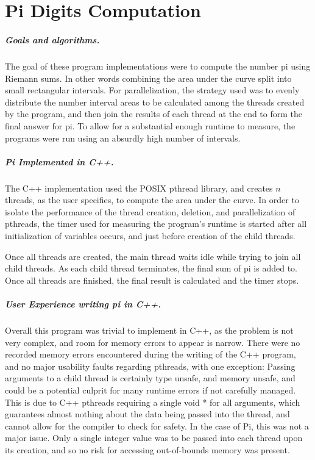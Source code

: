 \chapter{Pi Digits Computation}
\paragraph{Goals and algorithms.}
The goal of these program implementations were to compute the number pi using
Riemann sums. In other words combining the area under the curve split into small
rectangular intervals. For
parallelization, the strategy used was to evenly distribute the
number interval areas to be calculated among the threads created by the
program, and then join the results of each thread at the end to form the final
answer for pi. To allow for a substantial enough runtime to measure, the
programs were run using an absurdly high number of intervals.

\paragraph{Pi Implemented in C++.}
The C++ implementation used the POSIX pthread library, and creates $n$
threads, as the user specifies, to compute the area under the curve. In order
to isolate the performance of the thread creation, deletion, and parallelization
of pthreads, the timer used for measuring the program's runtime is started after
all initialization of variables occurs, and just before creation of the child
threads.

Once all
threads are created, the main thread waits idle while trying to join all child
threads. As each child thread terminates, the final sum of pi is added to. Once
all threads are finished, the final result is calculated and the timer stops.

\paragraph{User Experience writing pi in C++.}
Overall this program was trivial to implement in C++, as the problem is not very
complex, and room for memory errors to appear is narrow. There were no recorded
memory errors encountered during the writing of the C++ program, and no major
usability faults regarding pthreads, with one exception: Passing arguments to
a child thread is certainly type unsafe, and memory unsafe, and could be
a potential culprit for many runtime errors if not carefully managed. This is
due to C++ pthreads requiring a single {\cf void *} for all arguments, which
guarantees almost nothing about the data being passed into the thread, and
cannot allow for the compiler to check for safety. In the case of Pi, this was
not a major issue. Only a single integer value was to be passed into each
thread upon its creation, and so no risk for accessing out-of-bounds memory was
present.
